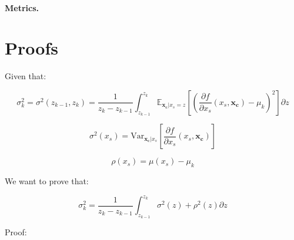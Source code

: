 \documentclass{article}
\newcommand{\dfdx}{\frac{\partial f}{\partial x_s}}
\newcommand{\xc}{\mathbf{x_c}}
\begin{document}


\paragraph{Metrics.}




\section{Proofs}
\label{sec:proofs}

Given that:

\[
  \sigma^2_k = \sigma^2(z_{k-1}, z_k) = \frac{1}{z_k - z_{k-1}} \int_{z_{k-1}}^{z_k}
  \mathbb{E}_{\xc|x_s=z} \left [ (\frac{\partial
      f}{\partial x_s}(x_s, \xc) - \mu_k )^2 \right] \partial z
\]


\[
\sigma^2(x_s) = \mathrm{Var}_{\xc|x_s}\left [\dfdx (x_s, \xc) \right ]
\]

\[
\rho(x_s) = \mu(x_s) - \mu_k
\]


We want to prove that:

\[
 \sigma^2_k = \frac{1}{z_k - z_{k-1}} \int_{z_{k-1}}^{z_k} \sigma^2(z) + \rho^2(z) \partial z
\]

Proof:
\end{document}
